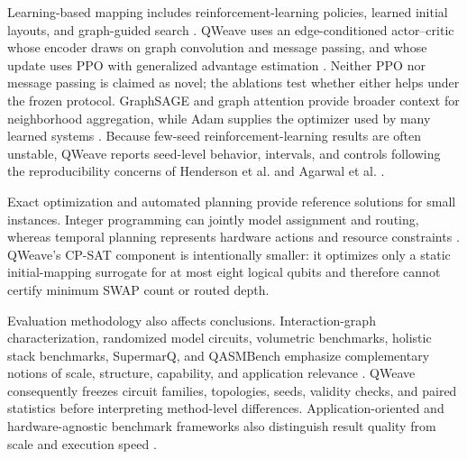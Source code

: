 \documentclass[conference]{IEEEtran}
\begin{document}
Learning-based mapping includes reinforcement-learning policies, learned
initial layouts, and graph-guided search \cite{herbert2018rl,pozzi2020rl,
acampora2021neural,sinha2022gnn}. QWeave uses an edge-conditioned actor--critic
whose encoder draws on graph convolution and message passing, and whose update
uses PPO with generalized advantage estimation
\cite{kipf2017gcn,gilmer2017mpnn,schulman2017ppo,schulman2015gae}. Neither PPO
nor message passing is claimed as novel; the ablations test whether either
helps under the frozen protocol. GraphSAGE and graph attention provide broader
context for neighborhood aggregation, while Adam supplies the optimizer used
by many learned systems \cite{hamilton2017graphsage,velickovic2018gat,
kingma2015adam}. Because few-seed reinforcement-learning results are often
unstable, QWeave reports seed-level behavior, intervals, and controls following
the reproducibility concerns of Henderson et al. and Agarwal et al.
\cite{henderson2018drl,agarwal2021rliable}.

Exact optimization and automated planning provide reference solutions for
small instances. Integer programming can jointly model assignment and routing,
whereas temporal planning represents hardware actions and resource constraints
\cite{nannicini2022ip,venturelli2018temporal,venturelli2019reasoning}.
QWeave's CP-SAT component is intentionally smaller: it optimizes only a static
initial-mapping surrogate for at most eight logical qubits and therefore cannot
certify minimum SWAP count or routed depth.

Evaluation methodology also affects conclusions. Interaction-graph
characterization, randomized model circuits, volumetric benchmarks, holistic
stack benchmarks, SupermarQ, and QASMBench emphasize complementary notions of
scale, structure, capability, and application relevance
\cite{bandic2023characterization,cross2019volume,
blumekohout2020volumetric,mills2021holistic,tomesh2022supermarq,
li2020qasmbench}. QWeave consequently freezes circuit families, topologies,
seeds, validity checks, and paired statistics before interpreting method-level
differences. Application-oriented and hardware-agnostic benchmark frameworks
also distinguish result quality from scale and execution speed
\cite{lubinski2023benchmarks,martiel2021qscore,resch2022benchmarking}.
\end{document}
